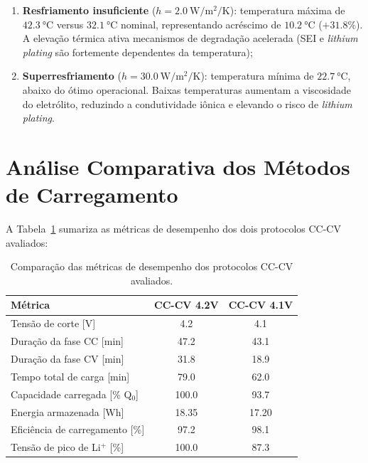 \documentclass[
    12pt,
    openright,
    twoside,
    a4paper,
    brazil,
    english
]{abntex2}
\begin{document}
\begin{enumerate}
  \item \textbf{Resfriamento insuficiente} ($h = \SI{2.0}{\watt\per\meter\squared\per\kelvin}$):
        temperatura máxima de $\SI{42.3}{\celsius}$ versus $\SI{32.1}{\celsius}$
        nominal, representando acréscimo de $\SI{+10.2}{\celsius}$ ($+31.8\%$).
        A elevação térmica ativa mecanismos de degradação acelerada (SEI e
        \textit{lithium plating} são fortemente dependentes da temperatura);

  \item \textbf{Superresfriamento} ($h = \SI{30.0}{\watt\per\meter\squared\per\kelvin}$):
        temperatura mínima de $\SI{22.7}{\celsius}$, abaixo do ótimo operacional.
        Baixas temperaturas aumentam a viscosidade do eletrólito, reduzindo a
        condutividade iônica e elevando o risco de \textit{lithium plating}.
\end{enumerate}

\section{Análise Comparativa dos Métodos de Carregamento}

A Tabela~\ref{tab:cccv_comparacao} sumariza as métricas de desempenho dos
dois protocolos CC-CV avaliados:

\begin{table}[htb]
  \centering
  \caption{Comparação das métricas de desempenho dos protocolos CC-CV avaliados.}
  \label{tab:cccv_comparacao}
  \begin{tabular}{lcc}
    \toprule
    \textbf{Métrica}                 & \textbf{CC-CV 4.2V} & \textbf{CC-CV 4.1V} \\
    \midrule
    Tensão de corte [V]              & 4.2                  & 4.1 \\
    Duração da fase CC [min]         & 47.2                 & 43.1 \\
    Duração da fase CV [min]         & 31.8                 & 18.9 \\
    Tempo total de carga [min]       & 79.0                 & 62.0 \\
    Capacidade carregada [\% Q$_0$]  & 100.0                & 93.7 \\
    Energia armazenada [Wh]          & 18.35                & 17.20 \\
    Eficiência de carregamento [\%]  & 97.2                 & 98.1 \\
    Tensão de pico de Li$^+$ [\%]    & 100.0                & 87.3 \\
    \bottomrule
  \end{tabular}
\end{table}
\end{document}
